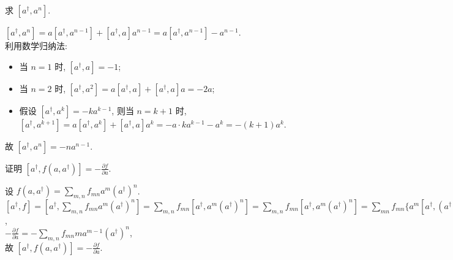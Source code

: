 \documentclass{assignment}
\begin{document}
\begin{prob}
    求 $[a^{\dagger},a^n]$.
\end{prob}
\begin{sol}
    $[a^{\dagger},a^n]=a[a^{\dagger},a^{n-1}]+[a^{\dagger},a]a^{n-1}=a[a^{\dagger},a^{n-1}]-a^{n-1}$.\\
    利用数学归纳法:
    \begin{itemize}
        \item 当 $n=1$ 时, $[a^{\dagger},a]=-1$;
        \item 当 $n=2$ 时, $[a^{\dagger},a^2]=a[a^{\dagger},a]+[a^{\dagger},a]a=-2a$;
        \item 假设 $[a^{\dagger},a^k]=-ka^{k-1}$, 则当 $n=k+1$ 时, $[a^{\dagger},a^{k+1}]=a[a^{\dagger},a^k]+[a^{\dagger},a]a^k=-a\cdot ka^{k-1}-a^k=-(k+1)a^k$.
    \end{itemize}
    故 $[a^{\dagger},a^n]=-na^{n-1}$.
\end{sol}

\begin{prob}
    证明 $[a^{\dagger},f(a,a^{\dagger})]=-\frac{\partial f}{\partial a}$.
\end{prob}
\begin{pf}
    设 $f(a,a^{\dagger})=\sum_{m,n}f_{mn}a^m(a^{\dagger})^n$.\\
    $[a^{\dagger},f]=[a^{\dagger},\sum_{m,n}f_{mn}a^m(a^{\dagger})^n]=\sum_{m,n}f_{mn}[a^{\dagger},a^m(a^{\dagger})^n]=\sum_{m,n}f_{mn}[a^{\dagger},a^m(a^{\dagger})^n]=\sum_{mn}f_{mn}\{a^m[a^{\dagger},(a^{\dagger})^n]+[a^{\dagger},a^m](a^{\dagger})^n\}=\sum_{m,n}f_{mn}[a^{\dagger},a^n](a^{\dagger})^n=-\sum_{m,n}f_{mn}ma^{m-1}(a^{\dagger})^n$,\\
    $-\frac{\partial f}{\partial a}=-\sum_{m,n}f_{mn}ma^{m-1}(a^{\dagger})^n$,\\
    故 $[a^{\dagger},f(a,a^{\dagger})]=-\frac{\partial f}{\partial a}$.
\end{pf}
\end{document}
